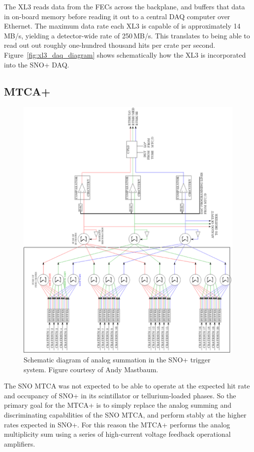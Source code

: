 The XL3 reads data from the FECs across the backplane, and buffers that data
in on-board memory before reading it out to a central DAQ computer over Ethernet.
The maximum data rate each XL3 is capable of is approximately
14\,MB/s, yielding a detector-wide rate of 250\,MB/s.
This translates to being able to read out out roughly one-hundred thousand
hits per crate per second.
Figure~\ref{fig:xl3_daq_diagram} shows schematically how the XL3 is
incorporated into the SNO+ DAQ\@.

\subsection{MTCA+}
\label{sec:mtcap}
\begin{figure}[htbp]
    \centering
    \includegraphics[width=1\textwidth]{mtcap_analog_diagram}
    \caption[MTCA+ Analog Diagram]{Schematic diagram of analog
    summation in the SNO+ trigger system. Figure courtesy of
    Andy Mastbaum.}%
\label{fig:mtcap_analog_diagram}
\end{figure}

The SNO MTCA was not expected to be able to operate at the expected
hit rate and occupancy of SNO+ in its scintillator or tellurium-loaded phases.
So the primary goal for the MTCA+ is to simply replace the analog summing
and discriminating capabilities of the SNO MTCA, and perform stably
at the higher rates expected in SNO+.
For this reason the MTCA+ performs the analog multiplicity sum using a series
of high-current voltage feedback operational amplifiers.

